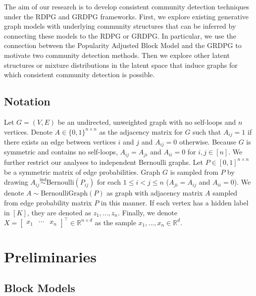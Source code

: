 \documentclass[
  11pt,
]{article}
\begin{document}
The aim of our research is to develop consistent community detection
techniques under the RDPG and GRDPG frameworks. First, we explore
existing generative graph models with underlying community structures
that can be inferred by connecting these models to the RDPG or GRDPG. In
particular, we use the connection between the Popularity Adjusted Block
Model \cite{307cbeb9b1be48299388437423d94bf1} and the GRDPG to motivate
two community detection methods. Then we explore other latent structures
or mixture distributions in the latent space that induce graphs for
which consistent community detection is possible.

\hypertarget{notation}{%
\subsection{Notation}\label{notation}}

Let \(G = (V, E)\) be an undirected, unweighted graph with no self-loops
and \(n\) vertices. Denote \(A \in \{0, 1\}^{n \times n}\) as the
adjacency matrix for \(G\) such that \(A_{ij} = 1\) if there exists an
edge between vertices \(i\) and \(j\) and \(A_{ij} = 0\) otherwise.
Because \(G\) is symmetric and contains no self-loops,
\(A_{ij} = A_{ji}\) and \(A_{ii} = 0\) for \(i, j \in [n]\). We further
restrict our analyses to independent Bernoulli graphs. Let
\(P \in [0, 1]^{n \times n}\) be a symmetric matrix of edge
probabilities. Graph \(G\) is sampled from \(P\) by drawing
\(A_{ij} \stackrel{\text{ind}}{\sim}\text{Bernoulli}(P_{ij})\) for each
\(1 \leq i < j \leq n\) (\(A_{ji} = A_{ij}\) and \(A_{ii} = 0\)). We
denote \(A \sim \text{BernoulliGraph}(P)\) as graph with adjacency
matrix \(A\) sampled from edge probability matrix \(P\) in this manner.
If each vertex has a hidden label in \([K]\), they are denoted as
\(z_1, ..., z_n\). Finally, we denote
\(X = \begin{bmatrix} x_1 & \cdots & x_n \end{bmatrix}^\top \in \mathbb{R}^{n \times d}\)
as the sample \(x_1, ..., x_n \in \mathbb{R}^d\).

\hypertarget{preliminaries}{%
\section{Preliminaries}\label{preliminaries}}

\hypertarget{block-models}{%
\subsection{Block Models}\label{block-models}}
\end{document}
